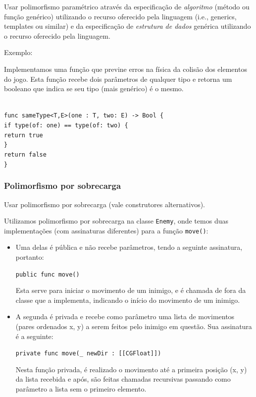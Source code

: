 \documentclass[rel_mlp]{iiufrgs}
\newcommand\tab[1][1cm]{\hspace*{#1}}
\begin{document}
Usar polimorfismo paramétrico através da especificação de \textit{algoritmo} (método ou função genérico) utilizando o recurso oferecido pela linguagem (i.e., generics, templates ou similar) e da especificação de \textit{estrutura de dados} genérica utilizando o recurso oferecido pela linguagem.

Exemplo:

Implementamos uma função que previne erros na física da colisão dos elementos do jogo. Esta função recebe dois parâmetros de qualquer tipo e retorna um booleano que indica se seu tipo (mais genérico) é o mesmo.

\texttt{\\func sameType<T,E>(one : T, two: E) -> Bool \{\\\tab if type(of: one) == type(of: two) \{\\\tab \tab return true\\\tab\}\\\tab return false\\\}}



\subsubsection{Polimorfismo por sobrecarga}

Usar polimorfismo por sobrecarga (vale construtores alternativos).

Utilizamos polimorfismo por sobrecarga na classe \texttt{Enemy}, onde temos duas implementações (com assinaturas diferentes) para a função \texttt{move()}:

\begin{itemize}
\setlength{\itemindent}{1em}
    \item Uma delas é pública e não recebe parâmetros, tendo a seguinte assinatura, portanto:
    
    \texttt{public func move()}
    
    Esta serve para iniciar o movimento de um inimigo, e é chamada de fora da classe que a implementa, indicando o início do movimento de um inimigo.
    
    \item A segunda é privada e recebe como parâmetro uma lista de movimentos (pares ordenados x, y) a serem feitos pelo inimigo em questão. Sua assinatura é a seguinte:
    
    \texttt{private func move(\_ newDir : [[CGFloat]])}
    
    Nesta função privada, é realizado o movimento até a primeira posição (x, y) da lista recebida e após, são feitas chamadas recursivas passando como parâmetro a lista sem o primeiro elemento.
\end{itemize}
\end{document}
